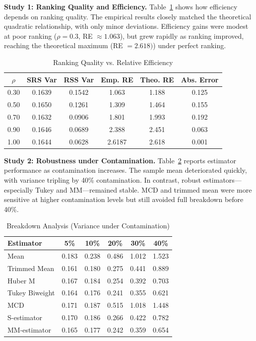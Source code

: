 \documentclass[12pt]{article}
\begin{document}
\textbf{Study 1: Ranking Quality and Efficiency.}
Table~\ref{tab:rank_eff} shows how efficiency depends on ranking quality. The empirical results closely matched the theoretical quadratic relationship, with only minor deviations. Efficiency gains were modest at poor ranking ($\rho=0.3$, RE $\approx 1.063$), but grew rapidly as ranking improved, reaching the theoretical maximum (RE $=2.618)$) under perfect ranking.

\begin{table}[htbp]
\centering
\caption{Ranking Quality vs. Relative Efficiency}\label{tab:rank_eff}
\begin{tabular}{cccccc}
\toprule
$\rho$ & SRS Var & RSS Var & Emp. RE & Theo. RE & Abs. Error \\
\midrule
0.30 & 0.1639 & 0.1542 & 1.063 & 1.188 & 0.125 \\
0.50 & 0.1650 & 0.1261 & 1.309 & 1.464 & 0.155 \\
0.70 & 0.1632 & 0.0906 & 1.801 & 1.993 & 0.192 \\
0.90 & 0.1646 & 0.0689 & 2.388 & 2.451 & 0.063 \\
1.00 & 0.1644 & 0.0628 & 2.6187 & 2.618 & 0.001 \\
\bottomrule
\end{tabular}
\end{table}

\textbf{Study 2: Robustness under Contamination.}
Table~\ref{tab:breakdown_analysis} reports estimator performance as contamination increases. The sample mean deteriorated quickly, with variance tripling by 40\% contamination. In contrast, robust estimators—especially Tukey and MM—remained stable. MCD and trimmed mean were more sensitive at higher contamination levels but still avoided full breakdown before 40\%.

\begin{table}[htbp]
\centering
\caption{Breakdown Analysis (Variance under Contamination)}
\label{tab:breakdown_analysis}
\begin{tabular}{lccccc}
\toprule
Estimator & 5\% & 10\% & 20\% & 30\% & 40\% \\
\midrule
Mean & 0.183 & 0.238 & 0.486 & 1.012 & 1.523 \\
Trimmed Mean & 0.161 & 0.180 & 0.275 & 0.441 & 0.889 \\
Huber M & 0.167 & 0.184 & 0.254 & 0.392 & 0.703 \\
Tukey Biweight & 0.164 & 0.176 & 0.241 & 0.355 & 0.621 \\
MCD & 0.171 & 0.187 & 0.515 & 1.018 & 1.448 \\
S-estimator & 0.170 & 0.186 & 0.266 & 0.422 & 0.782 \\
MM-estimator & 0.165 & 0.177 & 0.242 & 0.359 & 0.654 \\
\bottomrule
\end{tabular}
\end{table}
\end{document}
